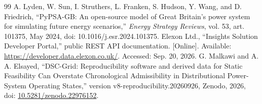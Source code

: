 \begin{thebibliography}{99}
 A. Lyden, W. Sun, I. Struthers, L. Franken, S. Hudson, Y. Wang, and D. Friedrich, ``PyPSA-GB: An open-source model of Great Britain's power system for simulating future energy scenarios,'' \emph{Energy Strategy Reviews}, vol. 53, art. 101375, May 2024, doi: 10.1016/j.esr.2024.101375.
 Elexon Ltd., ``Insights Solution Developer Portal,'' public REST API documentation. [Online]. Available: \url{https://developer.data.elexon.co.uk/}. Accessed: Sep. 20, 2026.
 G. Malkawi and A. A. Elsayed, ``DSC-Grid: Reproducibility software and derived data for Static Feasibility Can Overstate Chronological Admissibility in Distributional Power-System Operating States,'' version v8-reproducibility.20260926, Zenodo, 2026, doi: \href{https://doi.org/10.5281/zenodo.22976152}{\mbox{10.5281/zenodo.22976152}}.
\end{thebibliography}
